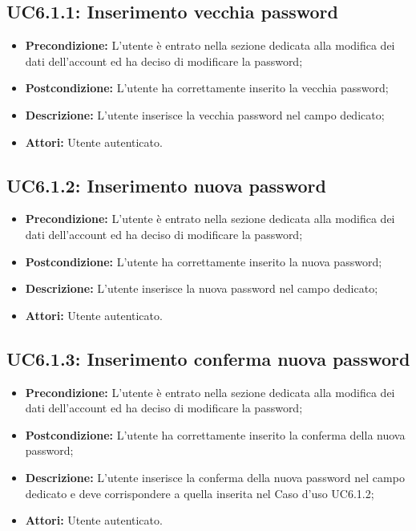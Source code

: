 \subsection{ UC6.1.1: Inserimento vecchia password}

\begin{itemize}
	\item \textbf{Precondizione:} L’utente è entrato nella sezione dedicata alla modifica dei dati dell’account ed ha deciso di modificare la password;
	\item \textbf{Postcondizione:} L’utente ha correttamente inserito la vecchia password;
	\item \textbf{Descrizione:} L’utente inserisce la vecchia password nel campo dedicato;
	\item \textbf{Attori:} Utente autenticato.
\end{itemize}
\subsection{ UC6.1.2: Inserimento nuova password}

\begin{itemize}
	\item \textbf{Precondizione:} L’utente è entrato nella sezione dedicata alla modifica dei dati dell’account ed ha deciso di modificare la password;
	\item \textbf{Postcondizione:}  L’utente ha correttamente inserito la nuova password;
	\item \textbf{Descrizione:} L’utente inserisce la nuova password nel campo dedicato;
	\item \textbf{Attori:} Utente autenticato.
\end{itemize}
\subsection{ UC6.1.3: Inserimento conferma nuova password}

\begin{itemize}
	\item \textbf{Precondizione:} L’utente è entrato nella sezione dedicata alla modifica dei dati dell’account ed ha deciso di modificare la password;
	\item \textbf{Postcondizione:} L’utente ha correttamente inserito la conferma della nuova password;
	\item \textbf{Descrizione:} L’utente inserisce la conferma della nuova password nel campo dedicato e deve corrispondere a quella inserita nel Caso d’uso UC6.1.2;
	\item \textbf{Attori:} Utente autenticato.
\end{itemize}
